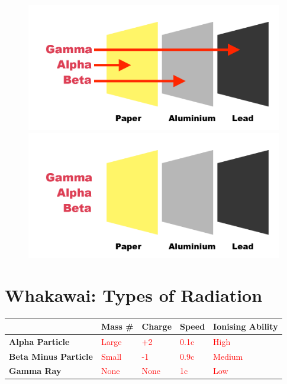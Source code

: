 \documentclass[12pt]{report}
\makeatletter
\DeclareRobustCommand{\fillinspace}[1]{%
	\ifthenelse
	{\boolean{@answer}}{\textcolor{red}{#1}}
	{\phantom{#1}}%
}
\makeatother
\begin{document}
\begin{figure}[ht]
	\centering
		{\includegraphics[width=0.9\linewidth]{radiation-penetration-answer.png}}
		{\includegraphics[width=0.9\linewidth]{radiation-penetration.png}}
\end{figure}

\section{Whakawai: Types of Radiation}


\begin{table}[ht]
\begin{tabular}{l|l|l|p{2cm}|l|}
\cline{2-5}
& \textbf{Mass \#} 		& \textbf{Charge} 		& \textbf{Speed} 				& \textbf{Ionising Ability} \\ \hline
\multicolumn{1}{|l|}{\textbf{Alpha Particle}} 		& \fillinspace{Large}   & \fillinspace{+2}      & \fillinspace{0.1c}   & \fillinspace{High} 		\\ \hline
\multicolumn{1}{|l|}{\textbf{Beta Minus Particle}}  & \fillinspace{Small}   & \fillinspace{-1}      & \fillinspace{0.9c}   & \fillinspace{Medium} 		\\ \hline
\multicolumn{1}{|l|}{\textbf{Gamma Ray}}      		& \fillinspace{None}    & \fillinspace{None}    & \fillinspace{1c}  & \fillinspace{Low} 		\\ \hline
\end{tabular}
\end{table}
\end{document}
